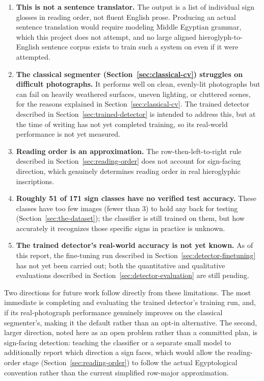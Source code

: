 \documentclass[11pt,a4paper]{report}
\begin{document}
\begin{enumerate}[label=(\arabic*)]
  \item \textbf{This is not a sentence translator.} The output is a list of
    individual sign glosses in reading order, not fluent English prose.
    Producing an actual sentence translation would require modeling Middle
    Egyptian grammar, which this project does not attempt, and no large
    aligned hieroglyph-to-English sentence corpus exists to train such a
    system on even if it were attempted.
  \item \textbf{The classical segmenter (Section~\ref{sec:classical-cv})
    struggles on difficult photographs.} It performs well on clean,
    evenly-lit photographs but can fail on heavily weathered surfaces,
    uneven lighting, or cluttered scenes, for the reasons explained in
    Section~\ref{sec:classical-cv}. The trained detector described in
    Section~\ref{sec:trained-detector} is intended to address this, but at
    the time of writing has not yet completed training, so its real-world
    performance is not yet measured.
  \item \textbf{Reading order is an approximation.} The row-then-left-to-right
    rule described in Section~\ref{sec:reading-order} does not account for
    sign-facing direction, which genuinely determines reading order in real
    hieroglyphic inscriptions.
  \item \textbf{Roughly 51 of 171 sign classes have no verified test
    accuracy.} These classes have too few images (fewer than 3) to hold any
    back for testing (Section~\ref{sec:the-dataset}); the classifier is
    still trained on them, but how accurately it recognizes those specific
    signs in practice is unknown.
  \item \textbf{The trained detector's real-world accuracy is not yet
    known.} As of this report, the fine-tuning run described in
    Section~\ref{sec:detector-finetuning} has not yet been carried out; both
    the quantitative and qualitative evaluations described in
    Section~\ref{sec:detector-evaluation} are still pending.
\end{enumerate}

Two directions for future work follow directly from these limitations. The
most immediate is completing and evaluating the trained detector's training
run, and, if its real-photograph performance genuinely improves on the
classical segmenter's, making it the default rather than an opt-in
alternative. The second, larger direction, noted here as an open problem
rather than a committed plan, is sign-facing detection: teaching the
classifier or a separate small model to additionally report which direction
a sign faces, which would allow the reading-order stage
(Section~\ref{sec:reading-order}) to follow the actual Egyptological
convention rather than the current simplified row-major approximation.
\end{document}
